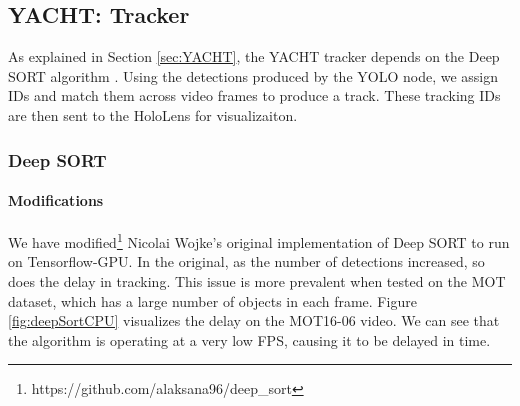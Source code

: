 \subsection{YACHT: Tracker}
As explained in Section \ref{sec:YACHT}, the YACHT tracker depends on the Deep SORT algorithm \cite{Wojke2018}. Using the detections produced by the YOLO node, we assign IDs and match them across video frames to produce a track. These tracking IDs are then sent to the HoloLens for visualizaiton.


\subsubsection{Deep SORT} 

\paragraph{Modifications} We have modified\footnote{https://github.com/alaksana96/deep\_sort} Nicolai Wojke's original implementation of Deep SORT to run on Tensorflow-GPU. In the original, as the number of detections increased, so does the delay in tracking. This issue is more prevalent when tested on the MOT dataset, which has a large number of objects in each frame. Figure \ref{fig:deepSortCPU} visualizes the delay on the MOT16-06 video. We can see that the algorithm is operating at a very low FPS, causing it to be delayed in time. 

